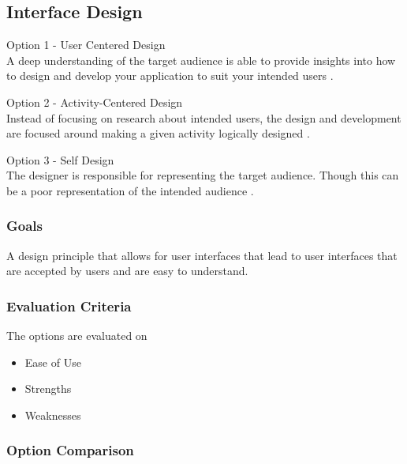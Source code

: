 \documentclass[onecolumn, draftclsnofoot,10pt, compsoc]{IEEEtran}
\begin{document}
{\newpage
\subsection{Interface Design}
\noindent Option 1 - User Centered Design \\
\noindent A deep understanding of the target audience is able to provide insights into how to design and develop your application to suit your intended users \cite{Usability}.

\medskip

\noindent Option 2 - Activity-Centered Design  \\
\noindent Instead of focusing on research about intended users, the design and development are focused around making a given activity logically designed \cite{AListApart}.

\medskip

\noindent Option 3 - Self Design \\
\noindent The designer is responsible for representing the target audience. Though this can be a poor representation of the intended audience \cite{AListApart}.

\medskip

\subsubsection{Goals}
\noindent A design principle that allows for user interfaces that lead to user interfaces that are accepted by users and are easy to understand.

\medskip

\subsubsection{Evaluation Criteria} 
\noindent The options are evaluated on
\begin{itemize}
\item Ease of Use
\item Strengths
\item Weaknesses
\end{itemize}

\newpage
\subsubsection{Option Comparison} ~\\

}
\end{document}

